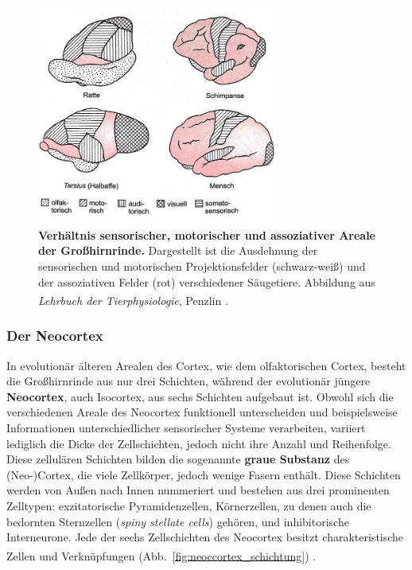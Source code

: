 \begin{figure}[H]
    \centering
    \includegraphics[width=0.7\textwidth]{pictures/Bilder_Jule/Andere/grosshirnrinde_vgl.png}
    \caption[Verhältnis sensorischer, motorischer und assoziativer Areale der Großhirnrinde]{\textbf{Verhältnis sensorischer, motorischer und assoziativer Areale der Großhirnrinde.} Dargestellt ist die Ausdehnung der sensorischen und motorischen Projektionsfelder (schwarz-weiß) und der assoziativen Felder (rot) verschiedener Säugetiere. Abbildung aus \textit{Lehrbuch der Tierphysiologie}, Penzlin \textsuperscript{\cite[Kap.~14]{penzlin2005tierphys}}.}
    \label{fig:grosshinrinde_vgl}
\end{figure}{}

\subsubsection*{Der Neocortex} 

In evolutionär älteren Arealen des Cortex, wie dem olfaktorischen Cortex, besteht die Großhirnrinde aus nur drei Schichten, während der evolutionär jüngere \textbf{Neocortex}, auch Isocortex, aus sechs Schichten aufgebaut ist. Obwohl sich die verschiedenen Areale des Neocortex funktionell unterscheiden und beispielsweise Informationen unterschiedlicher sensorischer Systeme verarbeiten, variiert lediglich die Dicke der Zellschichten, jedoch nicht ihre Anzahl und Reihenfolge. Diese zellulären Schichten bilden die sogenannte \textbf{graue Substanz} des (Neo-)Cortex, die viele Zellkörper, jedoch wenige Fasern enthält. Diese Schichten werden von Außen nach Innen nummeriert und bestehen aus drei prominenten Zelltypen: exzitatorische Pyramidenzellen, Körnerzellen, zu denen auch die bedornten Sternzellen (\textit{spiny stellate cells}) gehören, und inhibitorische Interneurone. Jede der sechs Zellschichten des Neocortex besitzt charakteristische Zellen und  Verknüpfungen (Abb.~\ref{fig:neoccortex_schichtung}) \textsuperscript{\cite[Kap.~7]{watson2010thebrain}}. 


